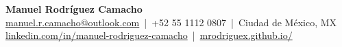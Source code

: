 \begin{center}
    {\LARGE \textbf{Manuel Rodríguez Camacho}}\\[6pt]
    \href{mailto:manuel.r.camacho@outlook.com}{manuel.r.camacho@outlook.com} \,|\, +52 55 1112 0807  \,|\, Ciudad de México, MX \\
    \href{https://www.linkedin.com/in/manuel-rodriguez-camacho/}{linkedin.com/in/manuel-rodriguez-camacho} \,|\, \href{https://mrodriguex.github.io/}{mrodriguex.github.io/}
\end{center}
